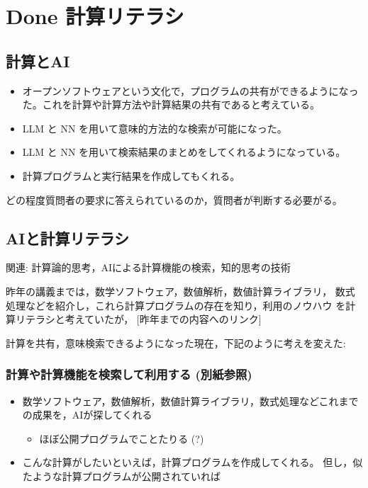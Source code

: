 \documentclass[dvipdfmx,11pat]{jarticle}
\begin{document}
\section{{\bfseries\sffamily Done} 計算リテラシ}
\label{sec:org0b2f5a8}
\subsection{計算とAI}
\label{sec:orgba22676}
\begin{itemize}
\item オープンソフトウェアという文化で，プログラムの共有ができるようになっ
た。これを計算や計算方法や計算結果の共有であると考えている。
\item LLM と NN を用いて意味的方法的な検索が可能になった。
\item LLM と NN を用いて検索結果のまとめをしてくれるようになっている。
\item 計算プログラムと実行結果を作成してもくれる。
\end{itemize}

どの程度質問者の要求に答えられているのか，質問者が判断する必要がる。
\subsection{AIと計算リテラシ}
\label{sec:orgd8f88f6}
関連: 計算論的思考，AIによる計算機能の検索，知的思考の技術

昨年の講義までは，数学ソフトウェア，数値解析，数値計算ライブラリ，
数式処理などを紹介し，これら計算プログラムの存在を知り，利用のノウハウ
を計算リテラシと考えていたが， [昨年までの内容へのリンク]

計算を共有，意味検索できるようになった現在，下記のように考えを変えた:
\subsubsection{計算や計算機能を検索して利用する  (別紙参照)}
\label{sec:org615e5e6}
\begin{itemize}
\item 数学ソフトウェア，数値解析，数値計算ライブラリ，数式処理などこれまで
の成果を，AIが探してくれる
\begin{itemize}
\item ほぼ公開プログラムでことたりる (?)
\end{itemize}

\item こんな計算がしたいといえば，計算プログラムを作成してくれる。
但し，似たような計算プログラムが公開されていれば
\end{itemize}
\end{document}
